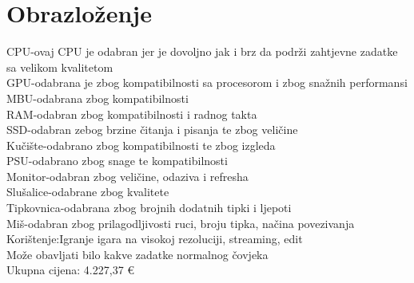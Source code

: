 \documentclass{article}
\begin{document}
\section{Obrazloženje}
CPU-ovaj CPU je odabran jer je dovoljno jak i brz da podrži zahtjevne zadatke sa velikom kvalitetom\\
GPU-odabrana je zbog kompatibilnosti sa procesorom i zbog snažnih performansi\\
MBU-odabrana zbog kompatibilnosti \\
RAM-odabran zbog kompatibilnosti i radnog takta\\
SSD-odabran zebog brzine čitanja i pisanja te zbog veličine\\
Kučište-odabrano zbog kompatibilnosti te zbog izgleda\\
PSU-odabrano zbog snage te kompatibilnosti\\
Monitor-odabran zbog veličine, odaziva i refresha\\
Slušalice-odabrane zbog kvalitete\\
Tipkovnica-odabrana zbog brojnih dodatnih tipki i ljepoti\\
Miš-odabran zbog prilagodljivosti ruci, broju tipka, načina povezivanja\\
Korištenje:Igranje igara na visokoj rezoluciji, streaming, edit\\
Može obavljati bilo kakve zadatke normalnog čovjeka\\

Ukupna cijena: 4.227,37 €
\end{document}
